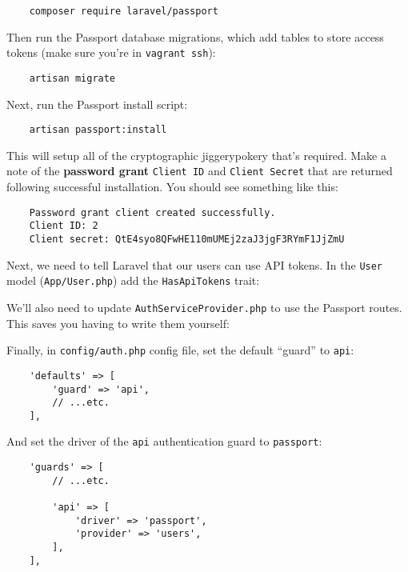 \begin{verbatim}
    composer require laravel/passport
\end{verbatim}

Then run the Passport database migrations, which add tables to store access tokens (make sure you're in \texttt{vagrant ssh}):

\begin{verbatim}
    artisan migrate
\end{verbatim}

Next, run the Passport install script:

\begin{verbatim}
    artisan passport:install
\end{verbatim}

This will setup all of the cryptographic jiggerypokery that's required. Make a note of the \textbf{password grant} \texttt{Client ID} and \texttt{Client Secret} that are returned following successful installation. You should see something like this:

\begin{verbatim}
    Password grant client created successfully.
    Client ID: 2
    Client secret: QtE4syo8QFwHE110mUMEj2zaJ3jgF3RYmF1JjZmU
\end{verbatim}

Next, we need to tell Laravel that our users can use API tokens. In the \texttt{User} model (\texttt{App/User.php}) add the \texttt{HasApiTokens} trait:



We'll also need to update \texttt{AuthServiceProvider.php} to use the Passport routes. This saves you having to write them yourself:



Finally, in \texttt{config/auth.php} config file, set the default ``guard'' to \texttt{api}:

\begin{verbatim}
    'defaults' => [
        'guard' => 'api',
        // ...etc.
    ],
\end{verbatim}

And set the driver of the \texttt{api} authentication guard to \texttt{passport}:

\begin{verbatim}
    'guards' => [
        // ...etc.

        'api' => [
            'driver' => 'passport',
            'provider' => 'users',
        ],
    ],
\end{verbatim}


